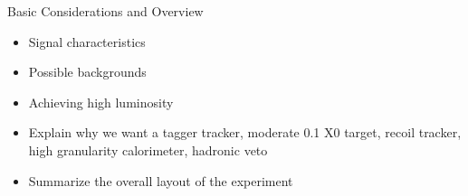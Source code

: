 
Basic Considerations and Overview
\begin{itemize}
    \item Signal characteristics
    \item Possible backgrounds 
    \item Achieving high luminosity 
    \item Explain why we want a tagger tracker, moderate 0.1 X0 target, recoil 
          tracker, high granularity calorimeter, hadronic veto
    \item Summarize the overall layout of the experiment 
\end{itemize}


